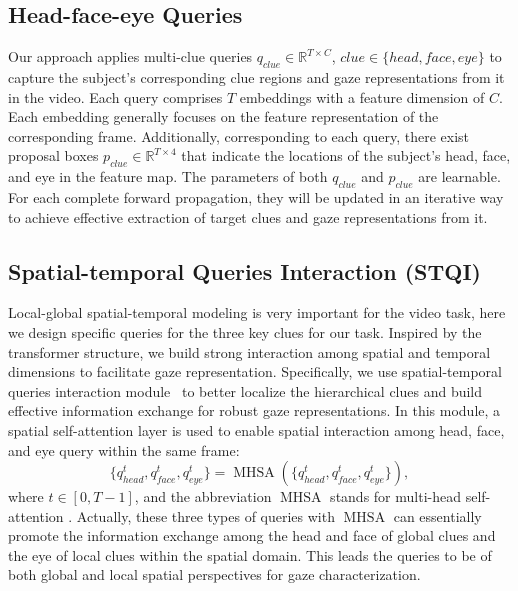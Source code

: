 \documentclass[journal]{IEEEtran}
\begin{document}
\subsection{Head-face-eye Queries}
Our approach applies multi-clue queries $q_{clue} \in \mathbb{R}^{T \times C}$, $clue \in \{head, face, eye\}$ to capture the subject's corresponding clue regions and gaze representations from it in the video. Each query comprises $T$ embeddings with a feature dimension of $C$. Each embedding generally focuses on the feature representation of the corresponding frame. Additionally, corresponding to each query, there exist proposal boxes $p_{clue}\in \mathbb{R}^{T \times 4}$ that indicate the locations of the subject's head, face, and eye in the feature map. The parameters of both $q_{clue}$ and $p_{clue}$ are learnable. For each complete forward propagation, they will be updated in an iterative way to achieve effective extraction of target clues and gaze representations from it.
 
\subsection{Spatial-temporal Queries Interaction (STQI)}
Local-global spatial-temporal modeling is very important for the video task\cite{local2023,local2020,liang2023local,cycmunet2023}, here we design specific queries for the three key clues for our task. Inspired by the transformer structure, we build strong interaction among spatial and temporal dimensions to facilitate gaze representation. Specifically, we use spatial-temporal queries interaction module~\cite{Tevit} to better localize the hierarchical clues and build effective information exchange for robust gaze representations. In this module, a spatial self-attention layer is used to enable spatial interaction among head, face, and eye query within the same frame:
\begin{equation}
\{q_{head}^{t},q_{face}^{t},q_{eye}^{t}\} = \operatorname{MHSA}(\{q_{head}^{t},q_{face}^{t},q_{eye}^{t}\}),
\end{equation}
where $t \in \left[0,T-1\right]$, and the abbreviation $\operatorname{MHSA}$ stands for multi-head self-attention \cite{attention}. Actually, these three types of queries with $\operatorname{MHSA}$ can essentially promote the information exchange among the head and face of global clues and the eye of local clues within the spatial domain. This leads the queries to be of both global and local spatial perspectives for gaze characterization.  
\end{document}
